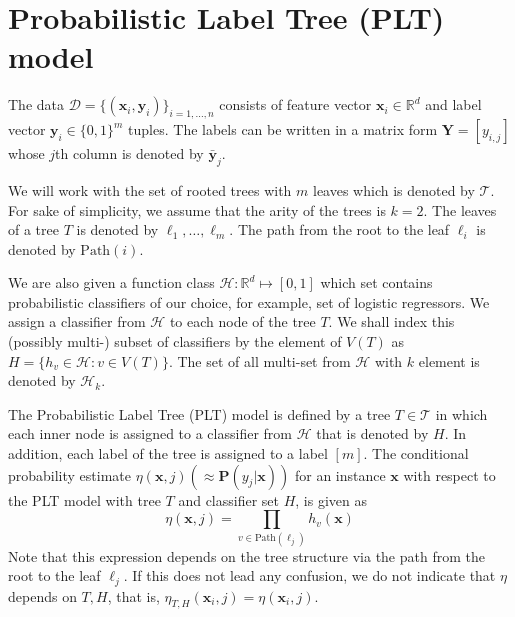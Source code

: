 \documentclass{article}
\newcommand{\R}{\mathbb{R}}
\newcommand{\cD}{\mathcal{D}}
\newcommand{\cH}{\mathcal{H}}
\newcommand{\cT}{\mathcal{T}}
\newcommand{\path}{\text{Path}}
\renewcommand{\vec}[1]{\mathbf{#1}}
\newcommand{\bx}{\mathbf{x}}
\newcommand{\by}{\vec{y}}
\newcommand{\bY}{\vec{Y}}
\newcommand{\prob}{\mathbf{P}}
\newcommand{\Algo}[1]{\textsc{#1}}
\begin{document}
\section{Probabilistic Label Tree (PLT) model}

The data $\cD = \{ (\bx_{i},\by_{i})\}_{i=1,\dots,n}$ consists of feature vector $\bx_i \in \R^d$ and label vector $\by_i\in \{ 0,1\}^m$ tuples. The labels can be written in a matrix form $\bY = [y_{i,j}]$ whose $j$\/th column is denoted by $\bar{\by}_{j}$.

We will work with the set of rooted trees with $m$ leaves which is denoted by $\cT$. For sake of simplicity, we assume that the arity of the trees is $k=2$. The leaves of a tree $T$ is denoted by $\ell_1, \dots , \ell_m$. The path from the root to the leaf $\ell_i$ is denoted by $\path (i )$. 


We are also given a function class $\cH : \R^d \mapsto [0,1]$ which set contains probabilistic classifiers of our choice, for example, set of logistic regressors. We assign a classifier from $\cH$ to each node of the tree $T$. We shall index this (possibly multi-) subset of classifiers by the element of $V(T)$ as $H = \{ h_{v} \in \cH : v\in V(T) \}$. The set of all multi-set from $\cH$ with $k$ element is denoted by  $\cH_k$.

The Probabilistic Label Tree (PLT) model is defined by a tree $T \in \cT$ in which each inner node is assigned to a classifier from $\cH$ that is denoted by $H$. In addition, each label of the tree is assigned to a label $[m]$. The conditional probability estimate $\eta( \bx, j ) (\approx \prob ( y_j \vert \bx))$ for an instance $\bx$ with respect to the \Algo{PLT} model with tree $T$ and classifier set $H$, is given as
\[
\eta( \bx, j ) = \prod_{v \in \path(\ell_j)} h_v (\bx) 
\]
Note that this expression depends on the tree structure via the path from the root to the leaf $\ell_j$. If this does not lead any confusion, we do not indicate that $\eta$ depends on $T,H$, that is, $\eta_{T,H}( \bx_i, j ) = \eta( \bx_i, j ) $.
\end{document}
